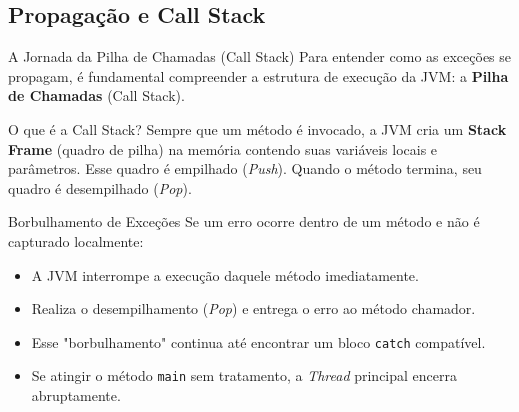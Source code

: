 \documentclass[9pt]{beamer}
\begin{document}
\subsection{Propagação e Call Stack}
\begin{frame}{A Jornada da Pilha de Chamadas (Call Stack)}
    Para entender como as exceções se propagam, é fundamental compreender a estrutura de execução da JVM: a \textbf{Pilha de Chamadas} (Call Stack).
    
    \vspace{0.2cm}
    
    \begin{block}{O que é a Call Stack?}
        Sempre que um método é invocado, a JVM cria um \textbf{Stack Frame} (quadro de pilha) na memória contendo suas variáveis locais e parâmetros. Esse quadro é empilhado (\textit{Push}). Quando o método termina, seu quadro é desempilhado (\textit{Pop}).
    \end{block}
    
    \begin{block}{Borbulhamento de Exceções}
        Se um erro ocorre dentro de um método e não é capturado localmente:
        \begin{itemize}
            \item A JVM interrompe a execução daquele método imediatamente.
            \item Realiza o desempilhamento (\textit{Pop}) e entrega o erro ao método chamador.
            \item Esse "borbulhamento" continua até encontrar um bloco \texttt{catch} compatível.
            \item Se atingir o método \texttt{main} sem tratamento, a \textit{Thread} principal encerra abruptamente.
        \end{itemize}
    \end{block}
\end{frame}
\end{document}
